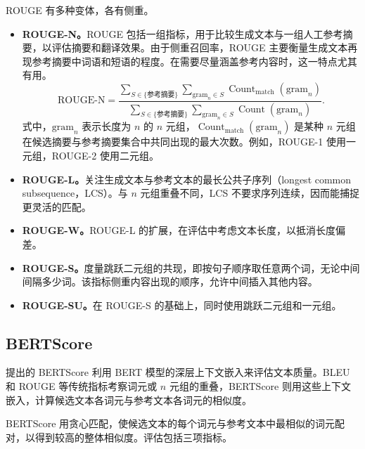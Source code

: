 ROUGE 有多种变体，各有侧重。

\begin{itemize}
\item \textbf{ROUGE-N。}ROUGE 包括一组指标，用于比较生成文本与一组人工参考摘要，以评估摘要和翻译效果。由于侧重召回率，ROUGE 主要衡量生成文本再现参考摘要中词语和短语的程度。在需要尽量涵盖参考内容时，这一特点尤其有用。
\begin{equation}
\mathrm{ROUGE\text{-}N}=
\frac{\sum_{S\in\{\text{参考摘要}\}}\sum_{\mathrm{gram}_n\in S}
       \operatorname{Count}_{\mathrm{match}}(\mathrm{gram}_n)}
     {\sum_{S\in\{\text{参考摘要}\}}\sum_{\mathrm{gram}_n\in S}
       \operatorname{Count}(\mathrm{gram}_n)}.
\label{eq:ch08-rouge}
\end{equation}
式中，$\mathrm{gram}_n$ 表示长度为 $n$ 的 $n$ 元组，$\operatorname{Count}_{\mathrm{match}}(\mathrm{gram}_n)$ 是某种 $n$ 元组在候选摘要与参考摘要集合中共同出现的最大次数。例如，ROUGE-1 使用一元组，ROUGE-2 使用二元组。
\item \textbf{ROUGE-L。}关注生成文本与参考文本的最长公共子序列（longest common subsequence，LCS）。与 $n$ 元组重叠不同，LCS 不要求序列连续，因而能捕捉更灵活的匹配。
\item \textbf{ROUGE-W。}ROUGE-L 的扩展，在评估中考虑文本长度，以抵消长度偏差。
\item \textbf{ROUGE-S。}度量跳跃二元组的共现，即按句子顺序取任意两个词，无论中间间隔多少词。该指标侧重内容出现的顺序，允许中间插入其他内容。
\item \textbf{ROUGE-SU。}在 ROUGE-S 的基础上，同时使用跳跃二元组和一元组。
\end{itemize}

\subsection{BERTScore}
提出的 BERTScore 利用 BERT 模型的深层上下文嵌入来评估文本质量。BLEU 和 ROUGE 等传统指标考察词元或 $n$ 元组的重叠，BERTScore 则用这些上下文嵌入，计算候选文本各词元与参考文本各词元的相似度。

BERTScore 用贪心匹配，使候选文本的每个词元与参考文本中最相似的词元配对，以得到较高的整体相似度。评估包括三项指标。


